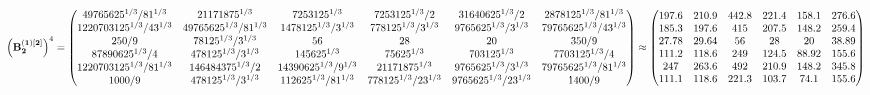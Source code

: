 \documentclass[10pt,a4paper]{article}
\begin{document}
	\[
		\left(\bold{B_2^{(1)[2]}}\right)^{4} = 
		\begin{pmatrix}
			{{4}{9765625^ {1 / 3}}} / {{81^ {1 / 3}}} & {{2}{1171875^ {1 / 3}}}{} & {{7}{253125^ {1 / 3}}}{} & {{7}{253125^ {1 / 3}}} / {{2}} & {{31640625^ {1 / 3}}} / {{2}} & {{28}{78125^ {1 / 3}}} / {{81^ {1 / 3}}} \\
			{{1220703125^ {1 / 3}}} / {{4}{3^ {1 / 3}}} & {{4}{9765625^ {1 / 3}}} / {{81^ {1 / 3}}} & {{14}{78125^ {1 / 3}}} / {{3^ {1 / 3}}} & {{7}{78125^ {1 / 3}}} / {{3^ {1 / 3}}} & {{9765625^ {1 / 3}}} / {{3^ {1 / 3}}} & {{7}{9765625^ {1 / 3}}} / {{4}{3^ {1 / 3}}} \\
			{{250}} / {{9}} & {{78125^ {1 / 3}}} / {{3^ {1 / 3}}} & {{56}}{} & {{28}}{} & {{20}}{} & {{350}} / {{9}} \\
			{{87890625^ {1 / 3}}} / {{4}} & {{4}{78125^ {1 / 3}}} / {{3^ {1 / 3}}} & {{14}{5625^ {1 / 3}}}{} & {{7}{5625^ {1 / 3}}}{} & {{703125^ {1 / 3}}}{} & {{7}{703125^ {1 / 3}}} / {{4}} \\
			{{1220703125^ {1 / 3}}} / {{81^ {1 / 3}}} & {{146484375^ {1 / 3}}} / {{2}} & {{14}{390625^ {1 / 3}}} / {{9^ {1 / 3}}} & {{2}{1171875^ {1 / 3}}}{} & {{9765625^ {1 / 3}}} / {{3^ {1 / 3}}} & {{7}{9765625^ {1 / 3}}} / {{81^ {1 / 3}}} \\
			{{1000}} / {{9}} & {{4}{78125^ {1 / 3}}} / {{3^ {1 / 3}}} & {{112}{625^ {1 / 3}}} / {{81^ {1 / 3}}} & {{7}{78125^ {1 / 3}}} / {{2}{3^ {1 / 3}}} & {{9765625^ {1 / 3}}} / {{2}{3^ {1 / 3}}} & {{1400}} / {{9}} \\
		\end{pmatrix}
		\approx
		\begin{pmatrix}
			197.6    & 210.9    & 442.8    & 221.4    & 158.1    & 276.6    \\
			185.3    & 197.6    & 415      & 207.5    & 148.2    & 259.4    \\
			27.78    & 29.64    & 56       & 28       & 20       & 38.89    \\
			111.2    & 118.6    & 249      & 124.5    & 88.92    & 155.6    \\
			247      & 263.6    & 492      & 210.9    & 148.2    & 345.8    \\
			111.1    & 118.6    & 221.3    & 103.7    & 74.1     & 155.6    \\
		\end{pmatrix}
	\]
\end{document}
